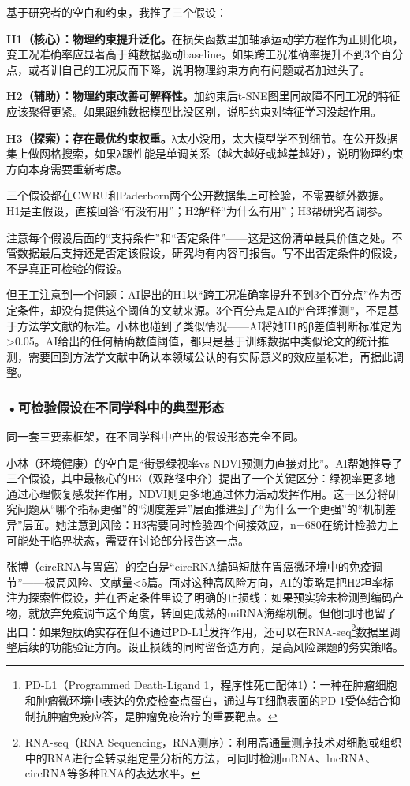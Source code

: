 \begin{aibox}
基于研究者的空白和约束，我推了三个假设：

\textbf{H1（核心）：物理约束提升泛化。}在损失函数里加轴承运动学方程作为正则化项，变工况准确率应显著高于纯数据驱动baseline。如果跨工况准确率提升不到3个百分点，或者训自己的工况反而下降，说明物理约束方向有问题或者加过头了。

\textbf{H2（辅助）：物理约束改善可解释性。}加约束后t-SNE图里同故障不同工况的特征应该聚得更紧。如果跟纯数据模型比没区别，说明约束对特征学习没起作用。

\textbf{H3（探索）：存在最优约束权重。}λ太小没用，太大模型学不到细节。在公开数据集上做网格搜索，如果λ跟性能是单调关系（越大越好或越差越好），说明物理约束方向本身需要重新考虑。

三个假设都在CWRU和Paderborn两个公开数据集上可检验，不需要额外数据。H1是主假设，直接回答``有没有用''；H2解释``为什么有用''；H3帮研究者调参。
\end{aibox}

\begin{critiquebox}
注意每个假设后面的``支持条件''和``否定条件''——这是这份清单最具价值之处。不管数据最后支持还是否定该假设，研究均有内容可报告。写不出否定条件的假设，不是真正可检验的假设。

但王工注意到一个问题：AI提出的H1以``跨工况准确率提升不到3个百分点''作为否定条件，却没有提供这个阈值的文献来源。3个百分点是AI的``合理推测''，不是基于方法学文献的标准。小林也碰到了类似情况——AI将她H1的β差值判断标准定为>0.05。AI给出的任何精确数值阈值，都只是基于训练数据中类似论文的统计推测，需要回到方法学文献中确认本领域公认的有实际意义的效应量标准，再据此调整。

\end{critiquebox}

\smallskip
\subsubsection*{\textbf{•可检验假设在不同学科中的典型形态}}同一套三要素框架，在不同学科中产出的假设形态完全不同。

小林（环境健康）的空白是``街景绿视率vs NDVI预测力直接对比''。AI帮她推导了三个假设，其中最核心的H3（双路径中介）提出了一个关键区分：绿视率更多地通过心理恢复感发挥作用，NDVI则更多地通过体力活动发挥作用。这一区分将研究问题从``哪个指标更强''的``测度差异''层面推进到了``为什么一个更强''的``机制差异''层面。她注意到风险：H3需要同时检验四个间接效应，n=680在统计检验力上可能处于临界状态，需要在讨论部分报告这一点。

张博（circRNA与胃癌）的空白是``circRNA编码短肽在胃癌微环境中的免疫调节''——极高风险、文献量<5篇。面对这种高风险方向，AI的策略是把H2坦率标注为探索性假设，并在否定条件里设了明确的止损线：如果预实验未检测到编码产物，就放弃免疫调节这个角度，转回更成熟的miRNA海绵机制。但他同时也留了出口：如果短肽确实存在但不通过PD-L1\footnote{PD-L1（Programmed Death-Ligand 1，程序性死亡配体1）：一种在肿瘤细胞和肿瘤微环境中表达的免疫检查点蛋白，通过与T细胞表面的PD-1受体结合抑制抗肿瘤免疫应答，是肿瘤免疫治疗的重要靶点。}发挥作用，还可以在RNA-seq\footnote{RNA-seq（RNA Sequencing，RNA测序）：利用高通量测序技术对细胞或组织中的RNA进行全转录组定量分析的方法，可同时检测mRNA、lncRNA、circRNA等多种RNA的表达水平。}数据里调整后续的功能验证方向。设止损线的同时留备选方向，是高风险课题的务实策略。


